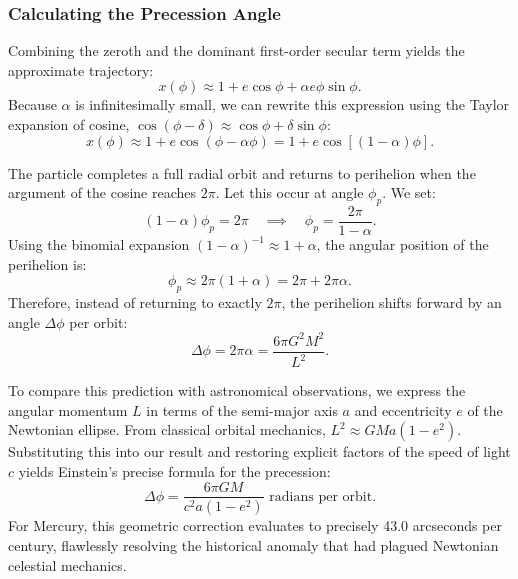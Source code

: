\documentclass[11pt, a4paper]{report}
\begin{document}
\subsubsection*{Calculating the Precession Angle}
Combining the zeroth and the dominant first-order secular term yields the approximate trajectory:
\begin{equation}
x(\phi) \approx 1 + e\cos\phi + \alpha e \phi \sin\phi.
\end{equation}
Because $\alpha$ is infinitesimally small, we can rewrite this expression using the Taylor expansion of cosine, $\cos(\phi - \delta) \approx \cos\phi + \delta\sin\phi$:
\begin{equation}
\label{eq:precession_phase}
x(\phi) \approx 1 + e \cos(\phi - \alpha\phi) = 1 + e \cos[(1-\alpha)\phi].
\end{equation}


The particle completes a full radial orbit and returns to perihelion when the argument of the cosine reaches $2\pi$. Let this occur at angle $\phi_{p}$. We set:
\begin{equation}
(1 - \alpha)\phi_{p} = 2\pi \quad \implies \quad \phi_{p} = \frac{2\pi}{1-\alpha}.
\end{equation}
Using the binomial expansion $(1-\alpha)^{-1} \approx 1 + \alpha$, the angular position of the perihelion is:
\begin{equation}
\phi_{p} \approx 2\pi(1 + \alpha) = 2\pi + 2\pi\alpha.
\end{equation}
Therefore, instead of returning to exactly $2\pi$, the perihelion shifts forward by an angle $\Delta\phi$ per orbit:
\begin{equation}
\Delta\phi = 2\pi\alpha = \frac{6\pi G^{2}M^{2}}{L^{2}}.
\end{equation}

To compare this prediction with astronomical observations, we express the angular momentum $L$ in terms of the semi-major axis $a$ and eccentricity $e$ of the Newtonian ellipse. From classical orbital mechanics, $L^{2} \approx GM a (1 - e^{2})$. Substituting this into our result and restoring explicit factors of the speed of light $c$ yields Einstein's precise formula for the precession:
\begin{equation}
\Delta\phi = \frac{6\pi GM}{c^{2}a(1-e^{2})} \text{ radians per orbit}.
\end{equation}
For Mercury, this geometric correction evaluates to precisely 43.0 arcseconds per century, flawlessly resolving the historical anomaly that had plagued Newtonian celestial mechanics.
\end{document}
